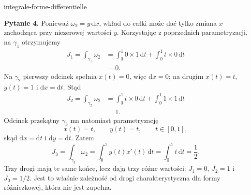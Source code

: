 \begin{exo}{integrale-forme-differentielle}
\begin{solution}
\textbf{Pytanie 4.} Ponieważ $\omega_2=y\,\mathrm{d}x$, wkład do całki może
dać tylko zmiana $x$ zachodząca przy niezerowej wartości $y$. Korzystając z
poprzednich parametryzacji, na $\gamma_1$ otrzymujemy
\[\begin{aligned}J_1=\int_{\gamma_1}\omega_2&=\int_0^1 0\times1\,\mathrm{d}t+\int_0^1 t\times0\,\mathrm{d}t\\&=0.\end{aligned}\]
Na $\gamma_2$ pierwszy odcinek spełnia $x(t)=0$, więc $\mathrm{d}x=0$; na
drugim $x(t)=t$, $y(t)=1$ i $\mathrm{d}x=\mathrm{d}t$. Stąd
\[\begin{aligned}J_2=\int_{\gamma_2}\omega_2&=\int_0^1 t\times0\,\mathrm{d}t+\int_0^1 1\times1\,\mathrm{d}t\\&=1.\end{aligned}\]
Odcinek przekątny $\gamma_3$ ma natomiast parametryzację
\[x(t)=t,\qquad y(t)=t,\qquad t\in[0,1],\]
skąd $\mathrm{d}x=\mathrm{d}t$ i $\mathrm{d}y=\mathrm{d}t$. Zatem
\[J_3=\int_{\gamma_3}\omega_2=\int_0^1 y(t)x'(t)\,\mathrm{d}t=\int_0^1 t\,\mathrm{d}t=\frac12.\]
Trzy drogi mają te same końce, lecz dają trzy różne wartości: $J_1=0$,
$J_2=1$ i $J_3=1/2$. Jest to właśnie zależność od drogi charakterystyczna
dla formy różniczkowej, która nie jest zupełna.
\end{solution}
\end{exo}


